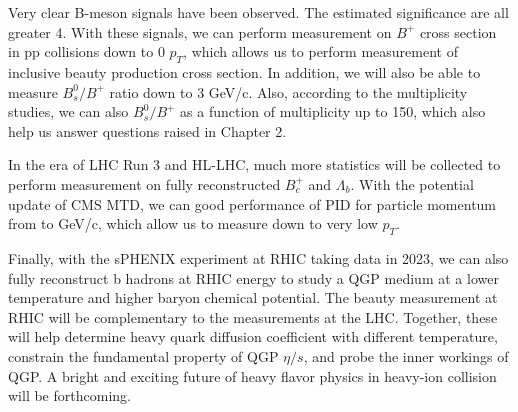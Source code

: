 Very clear B-meson signals have been observed. The estimated significance are all greater 4. With these signals, we can perform measurement on $B^+$ cross section in pp collisions down to 0 $p_T$, which allows us to perform measurement of inclusive beauty production cross section. In addition, we will also be able to measure $B^0_s/B^+$ ratio down to 3 GeV/c. Also, according to the multiplicity studies, we can also $B^0_s/B^+$ as a function of multiplicity up to 150, which also help us answer questions raised in Chapter 2. 

In the era of LHC Run 3 and HL-LHC, much more statistics will be collected to perform measurement on fully reconstructed $B^+_c$ and $\Lambda_b$. With the potential update of CMS MTD, we can good performance of PID for particle momentum from to GeV/c, which allow us to measure down to very low $p_T$. 

Finally, with the sPHENIX experiment at RHIC taking data in 2023, we can also fully reconstruct b hadrons at RHIC energy to study a QGP medium at a lower temperature and higher baryon chemical potential. The beauty measurement at RHIC will be complementary to the measurements at the LHC. Together, these will help determine heavy quark diffusion coefficient with different temperature, constrain the fundamental property of QGP $\eta/s$, and probe the inner workings of QGP. A bright and exciting future of heavy flavor physics in heavy-ion collision will be forthcoming.



